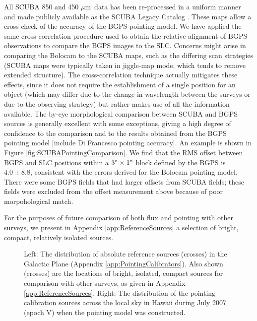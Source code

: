 \documentclass[12pt,preprint]{aastex}
\newcommand{\mum}{\ensuremath{\mu \mathrm{m}}}
\def\FigureTwo#1#2#3#4#5{
\begin{figure}[htb]
\epsscale{#5}
\plottwo{#1}{#2}
\caption{#3}
\label{#4}
\end{figure}
}
\begin{document}
All SCUBA 850 and 450 \mum\ data has been re-processed in a uniform
manner and made publicly available as the SCUBA Legacy Catalog
\citep[][hereafter SLC]{difrancesco08}.  These maps allow a 
cross-check of the accuracy of the BGPS pointing model.  We have applied the same
cross-correlation procedure used to obtain the relative alignment of
BGPS observations to compare the BGPS images to the SLC.  Concerns might arise
in comparing the Bolocam to the SCUBA maps, such as the differing scan
strategies (SCUBA maps were typically taken in jiggle-map mode, which tends to
remove extended structure).  The cross-correlation technique actually
mitigates these effects, since it does not require the establishment of a
single position for an object (which may differ due to the change in wavelength
between the surveys or due to the observing strategy) but rather makes use of
all the information available.  The by-eye morphological comparison between SCUBA and
BGPS sources is generally excellent with some exceptions, giving a high degree
of confidence to the comparison and to the results obtained from the BGPS pointing
model [include Di Francesco pointing accuracy].  An example is shown in Figure \ref{fig:SCUBAPointingComparison}.  We
find that the RMS offset between BGPS and SLC positions within a $3\mbox{$^\circ$}
\times 1\mbox{$^\circ$}$ block defined by the BGPS is $4.0\pm8.8$\arcsec, consistent
with the errors derived for the Bolocam pointing model.  There were some BGPS
fields that had larger offsets from SCUBA fields; these fields were excluded
from the offset measurement above because of poor morpohological match.

For the purposes of future comparison of both flux and pointing with
other surveys, we present in Appendix \ref{app:ReferenceSources} a
selection of bright, compact, relatively isolated sources.


\FigureTwo{plane_astrometry}{pointing_model_skydist}{Left: The
distribution of absolute reference sources (crosses) in the Galactic
Plane (Appendix \ref{app:PointingCalibrators}).  Also shown (crosses)
are the locations of bright, isolated, compact sources for comparison
with other surveys, as given in Appendix \ref{app:ReferenceSources}.
Right: The distribution of the pointing calibration sources across the
local sky in Hawaii during July 2007 (epoch V) when the pointing model
was constructed.  }{fig:PointingCalibrators}{1.0}
\end{document}
